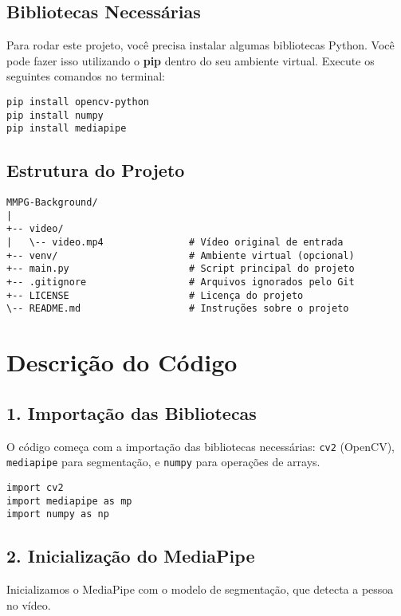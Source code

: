 \documentclass{article}%
\begin{document}
%
\subsection{Bibliotecas Necessárias}%
\label{subsec:BibliotecasNecessrias}%
Para rodar este projeto, você precisa instalar algumas bibliotecas Python. Você pode fazer isso utilizando o %
\textbf{pip}%
 dentro do seu ambiente virtual. Execute os seguintes comandos no terminal:%

\begin{verbatim}
pip install opencv-python
pip install numpy
pip install mediapipe
\end{verbatim}

%
\subsection{Estrutura do Projeto}%
\label{subsec:EstruturadoProjeto}%

\begin{verbatim}
MMPG-Background/
|
+-- video/
|   \-- video.mp4               # Vídeo original de entrada
+-- venv/                       # Ambiente virtual (opcional)
+-- main.py                     # Script principal do projeto
+-- .gitignore                  # Arquivos ignorados pelo Git
+-- LICENSE                     # Licença do projeto
\-- README.md                   # Instruções sobre o projeto
\end{verbatim}

%
\section{Descrição do Código}%
\label{sec:DescriodoCdigo}%
\subsection{1. Importação das Bibliotecas}%
\label{subsec:1.ImportaodasBibliotecas}%
O código começa com a importação das bibliotecas necessárias: %
\texttt{cv2}%
 (OpenCV), %
\texttt{mediapipe}%
 para segmentação, e %
\texttt{numpy}%
 para operações de arrays.%

\begin{verbatim}
import cv2
import mediapipe as mp
import numpy as np
\end{verbatim}

%
\subsection{2. Inicialização do MediaPipe}%
\label{subsec:2.InicializaodoMediaPipe}%
Inicializamos o MediaPipe com o modelo de segmentação, que detecta a pessoa no vídeo.%
\end{document}
